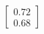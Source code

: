 \documentclass[preview]{standalone}
\begin{document}
\begin{align*}
\begin{bmatrix} 0.72 \\ 0.68 \end{bmatrix}
\end{align*}
\end{document}
